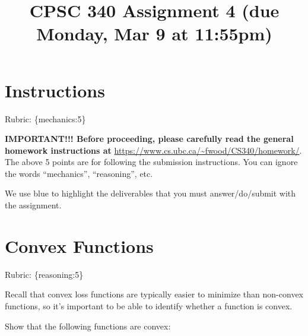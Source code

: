 \documentclass{article}
\def\rubric#1{\gre{Rubric: \{#1\}}}{}
\def\blu#1{{\color{blu}#1}}
\def\gre#1{{\color{gre}#1}}
\begin{document}
\title{CPSC 340 Assignment 4 (due Monday, Mar 9 at 11:55pm)}
\date{}
\maketitle

\vspace{-7em}


\section*{Instructions}
\rubric{mechanics:5}

\textbf{IMPORTANT!!! Before proceeding, please carefully read the general homework instructions at} \url{https://www.cs.ubc.ca/~fwood/CS340/homework/}. The above 5 points are for following the submission instructions. You can ignore the words ``mechanics'', ``reasoning'', etc.

\vspace{1em}
We use \blu{blue} to highlight the deliverables that you must answer/do/submit with the assignment.


\section{Convex Functions}
\rubric{reasoning:5}

Recall that convex loss functions are typically easier to minimize than non-convex functions, so it's important to be able to identify whether a function is convex.

\blu{Show that the following functions are convex}:
\end{document}
